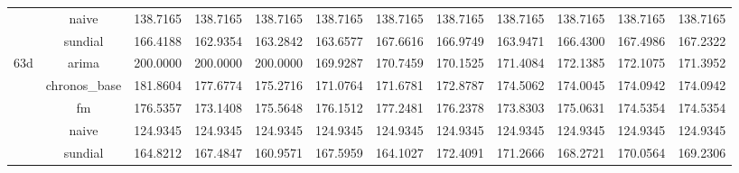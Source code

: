 \begin{table}[H]
{\begin{tabular}{cccccccccccc}
 & naive & 138.7165 & 138.7165 & 138.7165 & 138.7165 & 138.7165 & 138.7165 & 138.7165 & 138.7165 & 138.7165 & 138.7165 \\
 & sundial & 166.4188 & 162.9354 & 163.2842 & 163.6577 & 167.6616 & 166.9749 & 163.9471 & 166.4300 & 167.4986 & 167.2322 \\
\multirow[c]{5}{*}{63d} & arima & 200.0000 & 200.0000 & 200.0000 & 169.9287 & 170.7459 & 170.1525 & 171.4084 & 172.1385 & 172.1075 & 171.3952 \\
 & chronos_base & 181.8604 & 177.6774 & 175.2716 & 171.0764 & 171.6781 & 172.8787 & 174.5062 & 174.0045 & 174.0942 & 174.0942 \\
 & fm & 176.5357 & 173.1408 & 175.5648 & 176.1512 & 177.2481 & 176.2378 & 173.8303 & 175.0631 & 174.5354 & 174.5354 \\
 & naive & 124.9345 & 124.9345 & 124.9345 & 124.9345 & 124.9345 & 124.9345 & 124.9345 & 124.9345 & 124.9345 & 124.9345 \\
 & sundial & 164.8212 & 167.4847 & 160.9571 & 167.5959 & 164.1027 & 172.4091 & 171.2666 & 168.2721 & 170.0564 & 169.2306 \\
\bottomrule
\end{tabular}

 }
\end{table}
